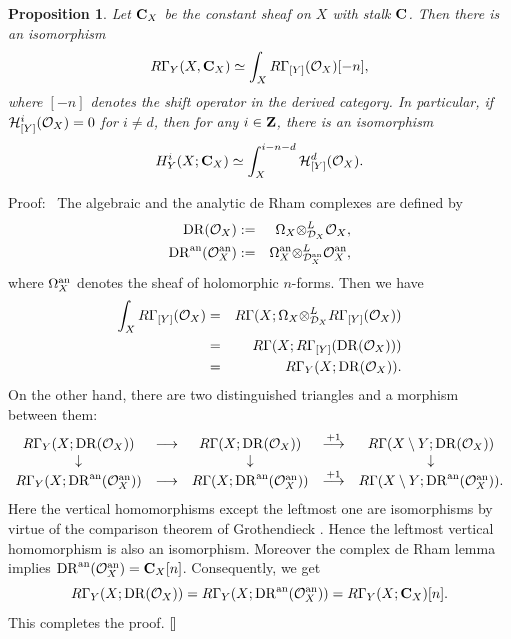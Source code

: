 \documentclass[12pt]{article}
\def\C{{\bf C}}
\def\Z{ {\bf Z} }
\def\Dsc{ {\cal D} }
\def\Hsc{ {\cal H} }
\def\Osc{ {\cal O} }
\newenvironment{proof}{\par\noindent Proof:\ }{${\tt [}\kern-0.2mm{\tt ]}$}
\newtheorem{proposition}[theorem]{Proposition}
\begin{document}
\begin{proposition}
\label{proposition:7.1}
Let $\C_X$ be the constant sheaf on $X$ with stalk $\C$.
Then there is an isomorphism
$$
R\Gamma_Y(X,\C_X) \simeq \int_X R\Gamma_{[Y]}(\Osc_X)[-n],
$$
where $[-n]$ denotes the shift operator in the derived category. 
In particular, if $\Hsc_{[Y]}^i(\Osc_X)=0$ for $i \neq d$, then
for any $i\in\Z$, there is an isomorphism
$$
H_Y^i(X; \C_X) \simeq \int_X^{i-n-d}\Hsc_{[Y]}^d(\Osc_X).
$$ 
\end{proposition}

\begin{proof}
The algebraic and the analytic de Rham complexes are defined by
\begin{eqnarray*}
{\rm DR}(\Osc_X) &:=& \Omega_X {\otimes}_{\Dsc_X}^{L} \Osc_X,\\
{\rm DR}^{{\rm an}}(\Osc^{\rm an}_X) &:=& 
\Omega^{\rm an}_X {\otimes}_{\Dsc^{\rm an}_X}^{L} \Osc^{\rm an}_X,
\end{eqnarray*}
where $\Omega^{\rm an}_X$ denotes the sheaf of holomorphic $n$-forms.
Then we have
\begin{eqnarray*}
\int_X R\Gamma_{[Y]}(\Osc_X) 
&=& R\Gamma(X; \Omega_X {\otimes}_{\Dsc_X}^{L} R\Gamma_{[Y]}(\Osc_X))\\
&=& R\Gamma(X; R\Gamma_{[Y]}({\rm DR}(\Osc_X)))\\
&=& R\Gamma_Y(X; {\rm DR}(\Osc_X)).
\end{eqnarray*}
On the other hand, there are two distinguished triangles and a morphism
between them:
$$\begin{array}{ccccc}
R\Gamma_Y(X; {\rm DR}(\Osc_X)) &\longrightarrow &
R\Gamma(X; {\rm DR}(\Osc_X)) &
\stackrel{+1}{\longrightarrow} &
R\Gamma(X\setminus Y; {\rm DR}(\Osc_X))\\
\downarrow & & \downarrow & & \downarrow\\
R\Gamma_Y(X; {\rm DR}^{\rm an}(\Osc^{\rm an}_X)) &\longrightarrow &
R\Gamma(X; {\rm DR}^{\rm an}(\Osc^{\rm an}_X)) &
\stackrel{+1}{\longrightarrow} &
R\Gamma(X\setminus Y; {\rm DR}^{\rm an}(\Osc^{\rm an}_X)).
\end{array}$$
Here the vertical homomorphisms except the leftmost one are isomorphisms
by virtue of the comparison theorem of Grothendieck \cite{G}.  
Hence the leftmost vertical homomorphism is also an isomorphism.
Moreover the complex de Rham lemma implies
${\rm DR}^{\rm an}(\Osc^{\rm an}_X) = \C_X[n]$.
Consequently, we get 
$$
R\Gamma_Y(X; {\rm DR}(\Osc_X)) 
= R\Gamma_Y(X; {\rm DR}^{\rm an}(\Osc^{\rm an}_X)) 
= R\Gamma_Y(X; \C_X)[n].
$$
This completes the proof.
\end{proof}
\end{document}
